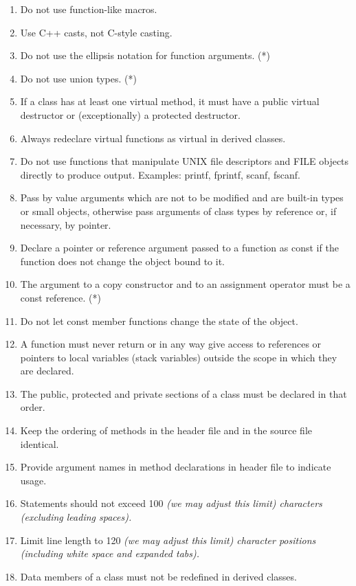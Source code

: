 \documentclass{cmspaper}
\begin{document}
\begin{enumerate}
\item Do not use function-like macros.
\item Use C++ casts, not C-style casting.
\item Do not use the ellipsis notation for function arguments. (*)
\item Do not use union types. (*)
\item If a class has at least one virtual method, it must have a
  public virtual destructor or (exceptionally) a protected destructor.
\item Always redeclare virtual functions as virtual in derived
  classes.
\item Do not use functions that manipulate UNIX file descriptors and FILE objects directly 
      to produce output. Examples: printf, fprintf, scanf, fscanf. 
\item Pass by value arguments which are not to be modified and are
  built-in types or small objects, otherwise pass arguments of class
  types by reference or, if necessary, by pointer. 
\item Declare a pointer or reference argument passed to a function as
  const if the function does not change the object bound to it. 
\item The argument to a copy constructor and to an assignment operator
  must be a const reference.  (*)
\item Do not let const member functions change the state of the object. 
\item A function must never return or in any way give access to
  references or pointers to local variables (stack variables) outside 
  the scope in which they are declared. 
\item The public, protected and private sections of a class must be
  declared in that order. 
\item Keep the ordering of methods in the header file and in the
  source file identical. 
\item Provide argument names in method declarations in header file to indicate
  usage.
\item Statements should not exceed 100 \em{(we may adjust this limit)}
  characters (excluding leading spaces). 
\item Limit line length to 120 \em{(we may adjust this limit)}
  character positions (including white space and expanded tabs). 
\item Data members of a class must not be redefined in derived classes. 

\end{enumerate}
\end{document}
